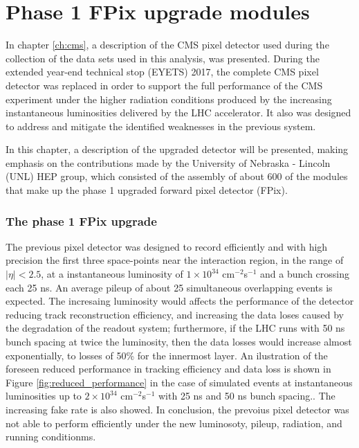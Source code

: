 \chapter{Phase 1 FPix upgrade modules}

In chapter \ref{ch:cms}, a description of the CMS pixel detector used during the collection of the data sets used in this analysis, was presented. During the extended year-end technical stop (EYETS) 2017, the complete CMS pixel detector was replaced in order to support the full performance of the CMS experiment under the higher radiation conditions produced by the increasing instantaneous luminosities delivered  by the LHC accelerator. It also was designed to address and mitigate the identified weaknesses in the previous system.

In this chapter, a description of the upgraded detector will be presented, making emphasis on the contributions made by the University of Nebraska - Lincoln (UNL) HEP group, which consisted of the assembly of about 600 of the modules that make up the phase 1 upgraded forward pixel detector (FPix).     

\subsection{The phase 1 FPix upgrade }

The previous pixel detector was designed to record efficiently and with high precision the first three space-points near the interaction region, in the range of $|\eta|<2.5$,  at a instantaneous luminosity of $1\times10^{34}$ cm$^{-2}$s$^{-1}$ and a bunch crossing each 25 ns. An average pileup of about 25 simultaneous overlapping events is expected. The incresaing luminosity would affects the performance of the detector reducing track reconstruction efficiency, and increasing the data loses caused by the degradation of the readout system; furthermore, if the LHC runs with 50 ns bunch spacing at twice the luminosity, then the data losses would increase almost exponentially, to losses of 50\% for the innermost layer. An ilustration of the foreseen reduced performance in tracking efficiency and data loss is shown in Figure \ref{fig:reduced_performance} in the case of simulated \ttbar events at instantaneous luminosities up to $2\times10^{34}$ cm$^{-2}$s$^{-1}$ with 25 ns and 50 ns bunch spacing.\cite{tdr}. The increasing fake rate is also showed. In conclusion, the prevoius pixel detector was not able to perform efficiently under the new luminosoty, pileup, radiation, and running conditionms.  

